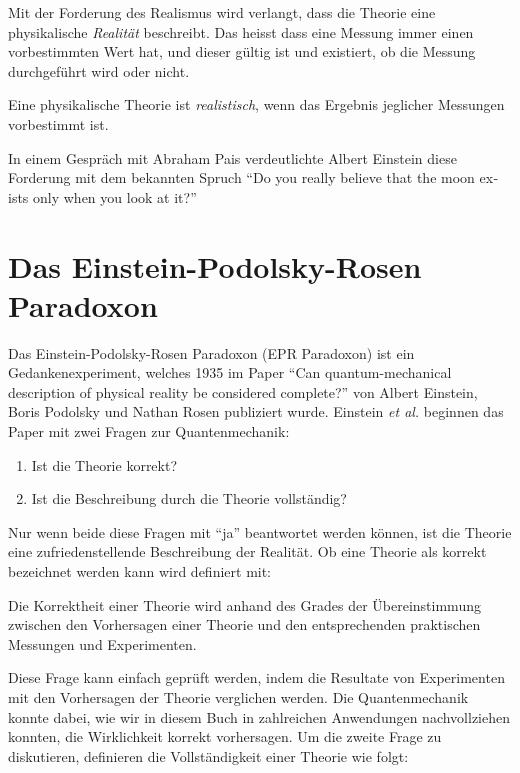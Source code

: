 \begin{refsection}
Mit der Forderung des Realismus wird verlangt, dass die Theorie eine
physikalische \emph{Realit\"at} beschreibt.
Das heisst dass eine Messung immer einen vorbestimmten Wert hat, und dieser
g\"ultig ist und existiert, ob die Messung durchgef\"uhrt wird oder nicht.

\begin{definition}\label{def:bell:}
    Eine physikalische Theorie ist \emph{realistisch}, wenn das Ergebnis
    jeglicher Messungen vorbestimmt ist.
\end{definition}

In einem Gespr\"ach mit Abraham Pais verdeutlichte Albert Einstein diese
Forderung mit dem bekannten Spruch
\foreignquote{english}{Do you really believe that the moon exists only when you look at it?}\cite{Bell:Pais1979}



\section{Das Einstein-Podolsky-Rosen Paradoxon\label{section:bell:epr}}
Das Einstein-Podolsky-Rosen Paradoxon (EPR Paradoxon) ist ein 
Gedankenexperiment, welches 1935 im Paper \cite{Bell:Einstein1935}
\enquote{Can quantum-mechanical description of physical reality be considered complete?}
von Albert Einstein, Boris Podolsky und Nathan Rosen publiziert wurde.
Einstein \emph{et al.} beginnen das Paper mit zwei Fragen zur
Quantenmechanik:

\begin{enumerate}
    \item Ist die Theorie korrekt?
    \item Ist die Beschreibung durch die Theorie vollst\"andig?
\end{enumerate}

Nur wenn beide diese Fragen mit \enquote{ja} beantwortet werden k\"onnen, 
ist die Theorie eine zufriedenstellende Beschreibung der Realit\"at.
Ob eine Theorie als korrekt bezeichnet werden kann wird definiert mit:

\begin{definition}\label{def:bell:Korrektheit}
    Die Korrektheit einer Theorie wird anhand des Grades der \"Ubereinstimmung
    zwischen den Vorhersagen einer Theorie und den entsprechenden praktischen
    Messungen und Experimenten.
\end{definition}

Diese Frage kann einfach gepr\"uft werden, indem die Resultate von
Experimenten mit den Vorhersagen der Theorie verglichen werden. 
Die Quantenmechanik konnte dabei, wie wir in diesem Buch in zahlreichen
Anwendungen nachvollziehen konnten, die Wirklichkeit korrekt vorhersagen. 
Um die zweite Frage zu diskutieren, definieren die Vollst\"andigkeit einer
Theorie wie folgt:


\end{refsection}
